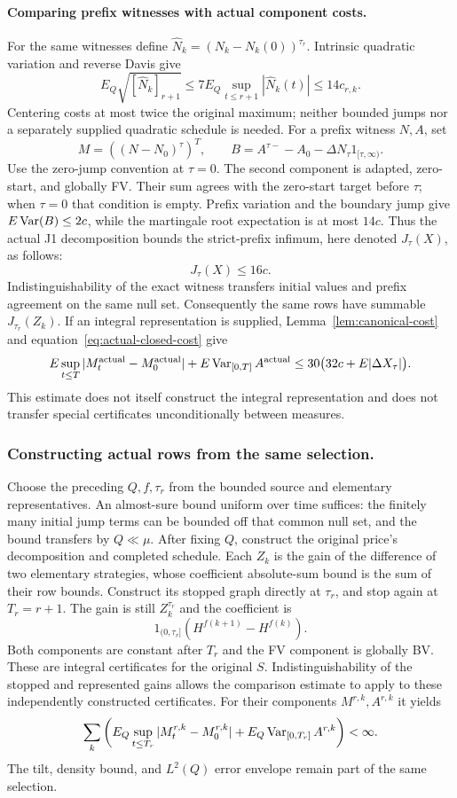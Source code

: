 \paragraph{Comparing prefix witnesses with actual component costs.}
For the same witnesses define
$\widehat N_k=(N_k-N_k(0))^{\tau_r}$.
Intrinsic quadratic variation and reverse Davis give
\[
 E_Q\sqrt{[\widehat N_k]_{r+1}}
 \leq7E_Q\sup_{t\leq r+1}|\widehat N_k(t)|\leq14c_{r,k}.
\]
Centering costs at most twice the original maximum; neither bounded jumps
nor a separately supplied quadratic schedule is needed.
For a prefix witness $N,A$, set
\[
 M=((N-N_0)^\tau)^T,\qquad
 B=A^{\tau-}-A_0-\Delta N_\tau1_{[\tau,\infty)}.
\]
Use the zero-jump convention at $\tau=0$.
The second component is adapted, zero-start, and globally FV. Their sum
agrees with the zero-start target before $\tau$; when $\tau=0$ that condition
is empty. Prefix variation and the boundary jump give $E\operatorname{Var}(B)\leq2c$,
while the martingale root expectation is at most $14c$.
Thus the actual J1 decomposition bounds the strict-prefix infimum,
here denoted $J_\tau(X)$, as follows:
\[
 J_\tau(X)\leq16c.
\]
Indistinguishability of the exact witness transfers initial values and prefix
agreement on the same null set. Consequently the same rows have summable
$J_{\tau_r}(Z_k)$.
If an integral representation is supplied, Lemma~\ref{lem:canonical-cost}
and equation~\eqref{eq:actual-closed-cost} give
\[
 E\sup_{t\leq T}|M^{\mathrm{actual}}_t-M^{\mathrm{actual}}_0|
 +E\operatorname{Var}_{[0,T]}A^{\mathrm{actual}}
 \leq30\bigl(32c+E|\Delta X_\tau|\bigr).
\]
This estimate does not itself construct the integral representation and does
not transfer special certificates unconditionally between measures.

\subsubsection{Constructing actual rows from the same selection.}\label{sec:actual-series}
Choose the preceding $Q,f,\tau_r$ from the bounded source and elementary
representatives. An almost-sure bound uniform over time suffices: the finitely
many initial jump terms can be bounded off that common null set, and the
bound transfers by $Q\ll\mu$.
After fixing $Q$, construct the original price's decomposition and completed
schedule. Each $Z_k$ is the gain of the difference of two elementary strategies,
whose coefficient absolute-sum bound is the sum of their row bounds.
Construct its stopped graph directly at $\tau_r$, and stop again at
$T_r=r+1$. The gain is still $Z_k^{\tau_r}$ and the coefficient is
\[
 1_{(0,\tau_r]}(H^{f(k+1)}-H^{f(k)}).
\]
Both components are constant after $T_r$ and the FV component is globally BV.
These are integral certificates for the original $S$.
Indistinguishability of the stopped and represented gains allows the
comparison estimate to apply to these independently constructed certificates.
For their components $M^{r,k},A^{r,k}$ it yields
\[
 \sum_k\left(E_Q\sup_{t\leq T_r}|M^{r,k}_t-M^{r,k}_0|
 +E_Q\operatorname{Var}_{[0,T_r]}A^{r,k}\right)<\infty.
\]
The tilt, density bound, and $L^2(Q)$ error envelope remain part of the same
selection.

